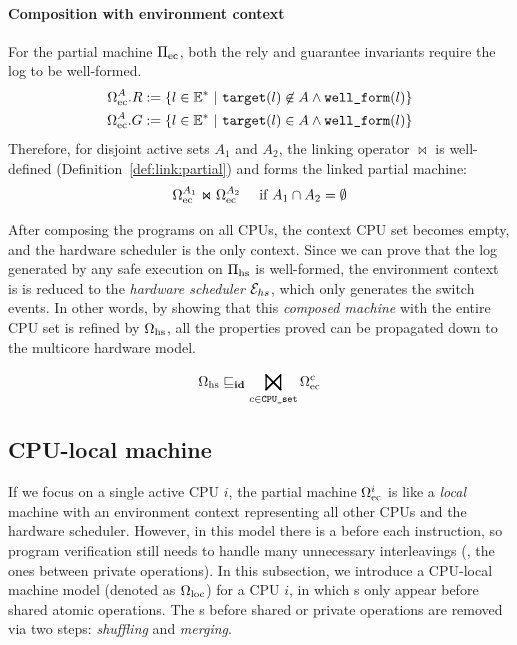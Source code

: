 \paragraph{Composition with environment context}
For the partial machine $\Pi_{\text{ec}}$,
both the rely and guarantee invariants
require the log to be well-formed.
\begin{align*}
\Omega_{\text{ec}}^A.R := \{ l \in \mathbb{E}^* \ |\ {{\texttt{target}}}(l) \not\in A
\land {\texttt{well\_form}}(l) \} \\
\Omega_{\text{ec}}^A.G := \{ l \in \mathbb{E}^* \ |\ {{\texttt{target}}}(l) \in A
\land {\texttt{well\_form}}(l) \}
\end{align*}
Therefore, for disjoint active sets $A_1$ and $A_2$,
the linking operator $\Join$ is well-defined 
(\cf Definition~\ref{def:link:partial})
and forms the linked partial machine:
\[\Omega_{\text{ec}}^{A_1} \Join \Omega_{\text{ec}}^{A_2}
\quad \text{ if } A_1 \cap A_2 = \emptyset\]

After composing the programs on all CPUs, the context CPU set becomes
empty, and the hardware scheduler is the only context.
Since we can prove that the log generated
by any safe execution on $\Pi_{\text{hs}}$
is well-formed,
the environment context is  is
reduced to the \emph{hardware scheduler}
$\mathcal{E}_{hs}$, which only generates the
switch events. In other words, by
showing that this \emph{composed machine} with the entire CPU set
is refined by $\Omega_{\text{hs}}$, 
all the properties proved can be propagated down to the
multicore hardware model.

\begin{lemma}
\[\pmach{hs} \refines_\id \bigJoin_{c\in\comm{CPU\_set}}
\pmach{ec}^{c}\]
\end{lemma}


\subsection{CPU-local machine}
\label{subsec:spec:seq}
If we focus on a single active CPU $i$,
the partial machine $\Omega_{\text{ec}}^i$ is like a \emph{local} machine
with an environment context representing all other CPUs
and the hardware scheduler. However,
in this model there is a {\intptext} before each instruction,
so program verification still needs to handle many unnecessary 
interleavings (\eg, the ones between private operations).
In this subsection, we introduce a CPU-local
machine model (denoted as $\Omega_{\text{loc}}$) for a CPU $i$, in which {\intptext}s
only appear before shared atomic operations.
The {\intptext}s before shared or private operations
are removed via two steps: \emph{shuffling} and \emph{merging}.

